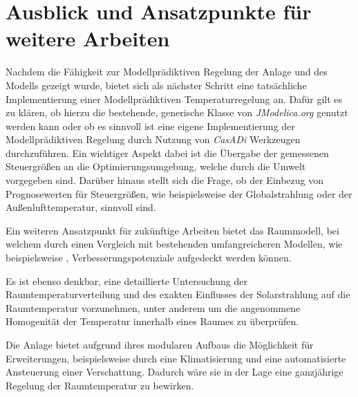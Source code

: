 \section{Ausblick und Ansatzpunkte für weitere Arbeiten}
\label{sec:ausblick}

Nachdem die Fähigkeit zur Modellprädiktiven Regelung der Anlage und des Modells gezeigt wurde, bietet sich als nächster Schritt eine tatsächliche Implementierung einer Modellprädiktiven Temperaturregelung an. Dafür gilt es zu klären, ob hierzu die bestehende, generische Klasse von \textit{JModelica.org} genutzt werden kann oder ob es sinnvoll ist eine eigene Implementierung der Modellprädiktiven Regelung durch Nutzung von \textit{CasADi} Werkzeugen durchzuführen. Ein wichtiger Aspekt dabei ist die Übergabe der gemessenen Steuergrößen an die Optimierungsumgebung, welche durch die Umwelt vorgegeben sind. Darüber hinaus stellt sich die Frage, ob der Einbezug von Prognosewerten für Steuergrößen, wie beispielsweise der Globalstrahlung oder der Außenlufttemperatur, sinnvoll sind. 

Ein weiteren Ansatzpunkt für zukünftige Arbeiten bietet das Raummodell, bei welchem durch einen Vergleich mit bestehenden umfangreicheren Modellen, wie beispielsweise \cite{therakles13}, Verbesserungspotenziale aufgedeckt werden können.

Es ist ebenso denkbar, eine detaillierte Untersuchung der Raumtemperaturverteilung und des exakten Einflusses der Solarstrahlung auf die Raumtemperatur vorzunehmen, unter anderem um die angenommene Homogenität der Temperatur innerhalb eines Raumes zu überprüfen.

Die Anlage bietet aufgrund ihres modularen Aufbaus die Möglichkeit für Erweiterungen, beispielsweise durch eine Klimatisierung und eine automatisierte Ansteuerung einer Verschattung. Dadurch wäre sie in der Lage eine ganzjährige Regelung der Raumtemperatur zu bewirken. 
